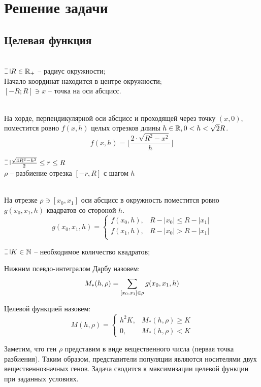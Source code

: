 \chapter{Решение задачи}
\section{Целевая функция}
\vspace*{-1em}
\quad\\
$\letus R \in \R_+$ -- радиус окружности;\\
\phantom{t} Начало координат находится в центре окружности;\\
\phantom{t} $[-R; R] \ni x$ -- точка на оси абсцисс.
\begin{lemma}\label{lem:1}\quad\\
    На хорде, перпендикулярной оси абсцисс и проходящей через точку $(x, 0)$, поместится ровно $f(x, h)$ целых отрезков длины $h \in \mathbb{R}, 0 < h < \sqrt{2}R$.
    $$f(x, h) = \lfloor \frac{2\cdot\sqrt{R^2 - x^2}}{h} \rfloor$$
\end{lemma}
$\letus \frac{\sqrt{4R^2-h^2}}{2} \le r \le R$\\
$\rho$ -- разбиение отрезка $[-r, R]$ с шагом $h$
\begin{lemma}\label{lem:2}\quad\\
    На отрезке $\rho \ni [x_0, x_1]$ оси абсцисс в окружность поместится ровно $g(x_0, x_1, h)$ квадратов со стороной $h$.
    \[
    g(x_0, x_1, h) = 
    \begin{cases}
        f(x_0, h), &R - |x_0| \le R - |x_1|\\
        f(x_1, h), &R - |x_0| > R - |x_1|\\
    \end{cases}
    \]  
\end{lemma}
$\letus K \in \N$ -- необходимое количество квадратов;
\begin{definition}
    Нижним псевдо-интегралом Дарбу назовем:
    $$\large
        M_*(h, \rho) = \sum_{[x_0, x_1] \in \rho}g(x_0, x_1, h)
    $$
\end{definition}
\begin{definition} Целевой функцией назовем:
    $$M(h, \rho) = 
    \begin{cases}
        h^2K, &M_*(h, \rho) \ge K\\
        0, &M_*(h, \rho) < K
    \end{cases} $$
\end{definition}

Заметим, что ген $\rho$ представим в виде вещественного числа (первая точка разбиения). 
Таким образом, представители популяции являются носителями двух вещественнозначных генов. Задача сводится к максимизации целевой функции при заданных условиях.
